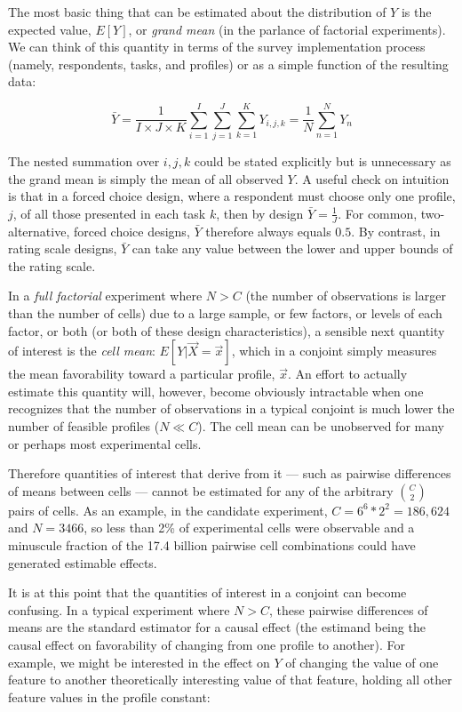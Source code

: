 \documentclass[a4paper,12pt]{article}\usepackage[]{graphicx}\usepackage[]{color}
\begin{document}
The most basic thing that can be estimated about the distribution of $Y$ is the expected value, $E[Y]$, or \textit{grand mean} (in the parlance of factorial experiments). We can think of this quantity in terms of the survey implementation process (namely, respondents, tasks, and profiles) or as a simple function of the resulting data:

\begin{equation}
\bar{Y} = \dfrac{1}{I \times J \times K} \sum_{i=1}^{I} \sum_{j=1}^{J} \sum_{k=1}^{K} Y_{i,j,k} = \dfrac{1}{N} \sum_{n=1}^{N} Y_n
\end{equation}

\noindent The nested summation over $i,j,k$ could be stated explicitly but is unnecessary as the grand mean is simply the mean of all observed $Y$. A useful check on intuition is that in a forced choice design, where a respondent must choose only one profile, $j$, of all those presented in each task $k$, then by design $\bar{Y} = \frac{1}{J}$. For common, two-alternative, forced choice designs, $\bar{Y}$ therefore always equals $0.5$. By contrast, in rating scale designs, $\bar{Y}$ can take any value between the lower and upper bounds of the rating scale.

In a \textit{full factorial} experiment where $N > C$ (the number of observations is larger than the number of cells) due to a large sample, or few factors, or levels of each factor, or both (or both of these design characteristics), a sensible next quantity of interest is the \textit{cell mean}: $E[Y|\vec{X} = \vec{x}]$, which in a conjoint simply measures the mean favorability toward a particular profile, $\vec{x}$. An effort to actually estimate this quantity will, however, become obviously intractable when one recognizes that the number of observations in a typical conjoint is much lower the number of feasible profiles ($N \ll C$). The cell mean can be unobserved for many or perhaps most experimental cells. 

Therefore quantities of interest that derive from it --- such as pairwise differences of means between cells --- cannot be estimated for any of the arbitrary $\binom{C}{2}$ pairs of cells. As an example, in the \cite{HainmuellerHopkinsYamamoto2014} candidate experiment, $C = 6^6 * 2^2 = 186,624$ and $N = 3466$, so less than 2\% of experimental cells were observable and a minuscule fraction of the 17.4 billion pairwise cell combinations could have generated estimable effects. 

It is at this point that the quantities of interest in a conjoint can become confusing. In a typical experiment where $N > C$, these pairwise differences of means are the standard estimator for a causal effect (the estimand being the causal effect on favorability of changing from one profile to another). For example, we might be interested in the effect on $Y$ of changing the value of one feature to another theoretically interesting value of that feature, holding all other feature values in the profile constant:
\end{document}
